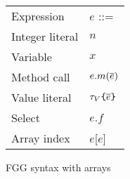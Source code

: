 \documentclass[acmsmall,screen]{acmart}
\begin{document}
\begin{figure}
{\begin{minipage}[t]{0.4\textwidth}
\begin{tabular}[t]{ll}
                Expression                        & $e$ ::=                                            \\
                \quad Integer literal             & \quad$n$                                           \\
                \quad Variable                    & \quad $x$                                          \\
                \quad Method call                 & \quad $e.m(\overline{e})$                                \\
                \quad Value literal               & \quad ${\color{black}\tau_V}\texttt{\{}\overline{e}\texttt{\}}$                  \\
                \quad Select                      & \quad $e.f$                                        \\
                \quad Array index                 & \quad$e$[$e$]
            \end{tabular}
        \end{minipage}
    }
    \caption{FGG syntax with arrays}
\end{figure}
\end{document}

